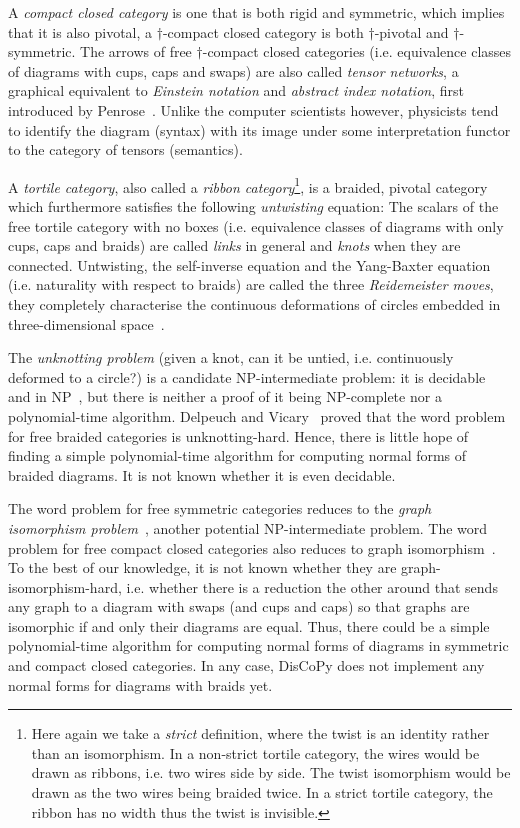 A \emph{compact closed category} is one that is both rigid and symmetric, which implies that it is also pivotal, a $\dagger$-compact closed category is both $\dagger$-pivotal and $\dagger$-symmetric.
The arrows of free $\dagger$-compact closed categories (i.e. equivalence classes of diagrams with cups, caps and swaps) are also called \emph{tensor networks}, a graphical equivalent to \emph{Einstein notation} and \emph{abstract index notation}, first introduced by Penrose~\cite{Penrose71}.
Unlike the computer scientists however, physicists tend to identify the diagram (syntax) with its image under some interpretation functor to the category of tensors (semantics).

A \emph{tortile category}, also called a \emph{ribbon category}\footnote
{Here again we take a \emph{strict} definition, where the twist is an identity rather than an isomorphism.
In a non-strict tortile category, the wires would be drawn as ribbons, i.e. two wires side by side.
The twist isomorphism would be drawn as the two wires being braided twice.
In a strict tortile category, the ribbon has no width thus the twist is invisible.},
is a braided, pivotal category which furthermore satisfies the following \emph{untwisting} equation:
The scalars of the free tortile category with no boxes (i.e. equivalence classes of diagrams with only cups, caps and braids) are called \emph{links} in general and \emph{knots} when they are connected.
Untwisting, the self-inverse equation and the Yang-Baxter equation (i.e. naturality with respect to braids) are called the three \emph{Reidemeister moves}, they completely characterise the continuous deformations of circles embedded in three-dimensional space~\cite{Reidemeister13}.

The \emph{unknotting problem} (given a knot, can it be untied, i.e. continuously deformed to a circle?) is a candidate NP-intermediate problem: it is decidable~\cite{Haken61} and in NP~\cite{Lackenby15}, but there is neither a proof of it being NP-complete nor a polynomial-time algorithm.
Delpeuch and Vicary~\cite{DelpeuchVicary21} proved that the word problem for free braided categories is unknotting-hard.
Hence, there is little hope of finding a simple polynomial-time algorithm for computing normal forms of braided diagrams.
It is not known whether it is even decidable.

The word problem for free symmetric categories reduces to the \emph{graph isomorphism problem}~\cite{PattersonEtAl21}, another potential NP-intermediate problem.
The word problem for free compact closed categories also reduces to graph isomorphism~\cite{Selinger07}.
To the best of our knowledge, it is not known whether they are graph-isomorphism-hard, i.e. whether there is a reduction the other around that sends any graph to a diagram with swaps (and cups and caps) so that graphs are isomorphic if and only their diagrams are equal.
Thus, there could be a simple polynomial-time algorithm for computing normal forms of diagrams in symmetric and compact closed categories.
In any case, DisCoPy does not implement any normal forms for diagrams with braids yet.

